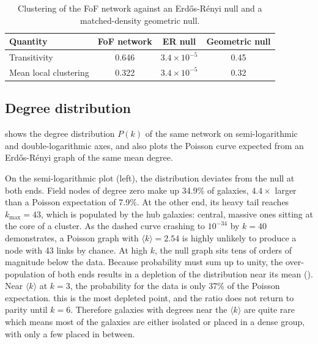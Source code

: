 \documentclass[9pt,a4paper,twocolumn,twoside]{rho-class/rho}
\begin{document}
\begin{table}[H]
    \caption{Clustering of the FoF network against an Erd\H{o}s-R\'enyi null
    and a matched-density geometric null.}
    \label{tab:clustering}
    \centering
    \begin{tabular}{lccc}
        \toprule
        Quantity & FoF network & ER null & Geometric null \\
        \midrule
        Transitivity          & 0.646 & $3.4\times10^{-5}$ & 0.45 \\
        Mean local clustering & 0.322 & $3.4\times10^{-5}$ & 0.32 \\
        \bottomrule
    \end{tabular}
\end{table}

\newpage

\subsection{Degree distribution}

 shows the degree distribution $P(k)$ of the same network on
semi-logarithmic and double-logarithmic axes, and also plots the Poisson curve
expected from an Erd\H{o}s-R\'enyi graph of the same mean degree.

On the semi-logarithmic
plot (left), the distribution deviates from the null at both ends. Field nodes of degree zero
make up 34.9\% of galaxies, $4.4\times$ larger than a Poisson expectation of 7.9\%.
At the other end, its heavy tail reaches $k_{\max} = 43$, which is populated by the hub galaxies:
central, massive ones sitting at the core of a cluster. As the dashed curve crashing to
$10^{-34}$ by $k=40$ demonstrates, a Poisson graph with $\langle k\rangle
= 2.54$ is highly unlikely to produce a node with 43 links by chance.
At high $k$, the null graph sits tens of orders
of magnitude below the data. Because probability must sum up to unity, the
over-population of both ends results in a depletion of the distribution near its mean
(). Near $\langle k\rangle$ at $k=3$, the probability for the data is only 37\% of the Poisson
expectation. this is the most depleted point, and the ratio does not return to parity
until $k=6$. Therefore galaxies with degrees near the $\langle k\rangle$ are quite rare which means
most of the galaxies are either isolated or placed in a dense group, with only a few placed in between.
\end{document}
